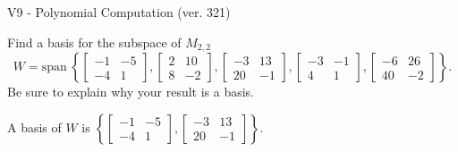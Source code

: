 \begin{exercise}
  \begin{exerciseTitle}V9 - Polynomial Computation (ver. 321)\end{exerciseTitle}
  \begin{exerciseStatement}
    Find a basis for the subspace of \(M_{2,2}\) 
\[W=\mathrm{span}\ \left\{\left[\begin{array}{cc}
-1 & -5 \\
-4 & 1
\end{array}\right] , \left[\begin{array}{cc}
2 & 10 \\
8 & -2
\end{array}\right] , \left[\begin{array}{cc}
-3 & 13 \\
20 & -1
\end{array}\right] , \left[\begin{array}{cc}
-3 & -1 \\
4 & 1
\end{array}\right] , \left[\begin{array}{cc}
-6 & 26 \\
40 & -2
\end{array}\right]\right\}.\]
 Be sure to explain why your result is a basis.


  \end{exerciseStatement}
  \begin{exerciseAnswer}
   A basis of \(W\) is  \(\left\{\left[\begin{array}{cc}
-1 & -5 \\
-4 & 1
\end{array}\right] , \left[\begin{array}{cc}
-3 & 13 \\
20 & -1
\end{array}\right]\right\}\).
  


  \end{exerciseAnswer}
\end{exercise}